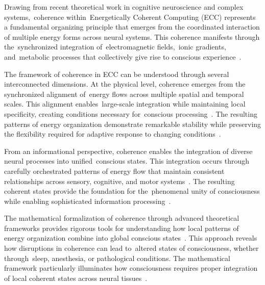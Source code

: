 Drawing from recent theoretical work in cognitive neuroscience and complex systems,~coherence within~Energetically Coherent Computing (ECC) represents a fundamental organizing principle that emerges from the coordinated interaction of multiple energy forms across neural systems. This coherence manifests through the~synchronized integration of~electromagnetic fields,~ionic gradients, and~metabolic processes that collectively give rise to conscious experience~\cite{pinotsis2023cytoelectric, hunt2024electromagnetic}.

The framework of coherence in ECC can be understood through several interconnected dimensions. At the physical level, coherence emerges from the synchronized alignment of~energy flows across multiple spatial and temporal scales. This alignment enables~large-scale integration while maintaining local specificity, creating conditions necessary for~conscious processing~\cite{breakspear2005dynamics}. The resulting patterns of energy organization demonstrate remarkable stability while preserving the flexibility required for adaptive response to changing conditions~\cite{freeman2007}.

From an informational perspective, coherence enables the integration of diverse neural processes into unified~conscious states. This integration occurs through carefully orchestrated patterns of energy flow that maintain consistent relationships across sensory, cognitive, and motor systems~\cite{van2025processes}. The resulting coherent states provide the foundation for the~phenomenal unity of consciousness while enabling sophisticated information processing~\cite{da2024mathematical}.

The mathematical formalization of coherence through advanced theoretical frameworks provides rigorous tools for understanding how local patterns of energy organization combine into global conscious states~\cite{amil2024theta}. This approach reveals how disruptions in coherence can lead to~altered states of consciousness, whether through~sleep, anesthesia, or pathological conditions. The mathematical framework particularly illuminates how consciousness requires proper integration of local coherent states across neural tissues~\cite{bosl2025dynamical}.

